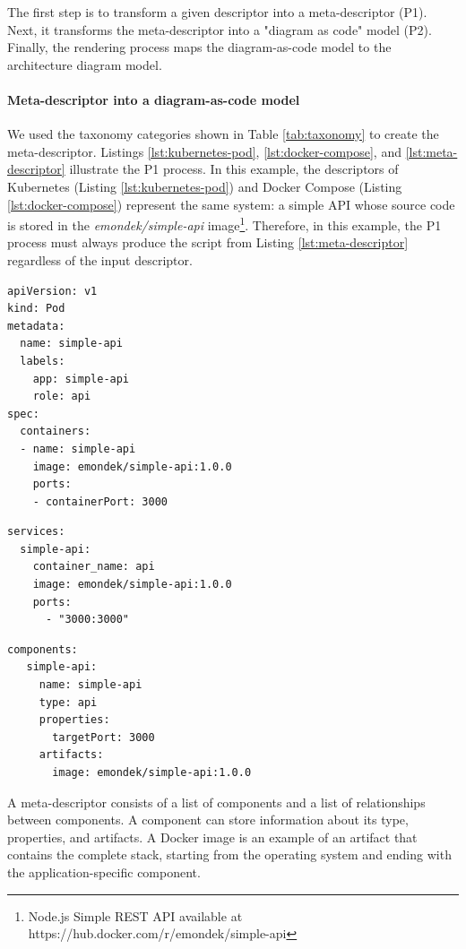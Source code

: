 \documentclass[sigconf]{acmart}
\begin{document}
The first step is to transform a given descriptor into a meta-descriptor (P1). Next, it transforms the meta-descriptor into a "diagram as code" model (P2). Finally, the rendering process  maps the diagram-as-code model to the architecture diagram model.

\paragraph{\textbf{Meta-descriptor into a diagram-as-code model}}
We used the taxonomy categories shown in Table \ref{tab:taxonomy} to create the meta-descriptor. Listings  \ref{lst:kubernetes-pod}, \ref{lst:docker-compose}, and \ref{lst:meta-descriptor} illustrate the P1 process. In this example, the descriptors of Kubernetes (Listing \ref{lst:kubernetes-pod}) and Docker Compose (Listing \ref{lst:docker-compose}) represent the same system: a simple API whose source code is stored in the \textit{emondek/simple-api} image\footnote{Node.js Simple REST API available at https://hub.docker.com/r/emondek/simple-api }. Therefore, in this example, the P1 process must always produce the script from Listing \ref{lst:meta-descriptor} regardless of the input descriptor.

\begin{lstlisting}[caption={Kubernetes pod script}, label={lst:kubernetes-pod}]
apiVersion: v1
kind: Pod
metadata:
  name: simple-api
  labels:
    app: simple-api
    role: api
spec:
  containers:
  - name: simple-api
    image: emondek/simple-api:1.0.0		
    ports:
    - containerPort: 3000
\end{lstlisting}

\begin{lstlisting}[caption={Docker Compose script}, label={lst:docker-compose}]
services:
  simple-api:
    container_name: api
    image: emondek/simple-api:1.0.0
    ports:
      - "3000:3000"
\end{lstlisting}

\begin{lstlisting}[caption={Meta descriptor script}, label={lst:meta-descriptor}]
components:
   simple-api:
   	 name: simple-api
   	 type: api
   	 properties:
   	   targetPort: 3000
   	 artifacts:
   	   image: emondek/simple-api:1.0.0
\end{lstlisting}

A meta-descriptor consists of a list of components and a list of relationships between components. A component can store information about its type, properties, and artifacts. A Docker image is an example of an artifact that contains the complete stack, starting from the operating system and ending with the application-specific component.
\end{document}
